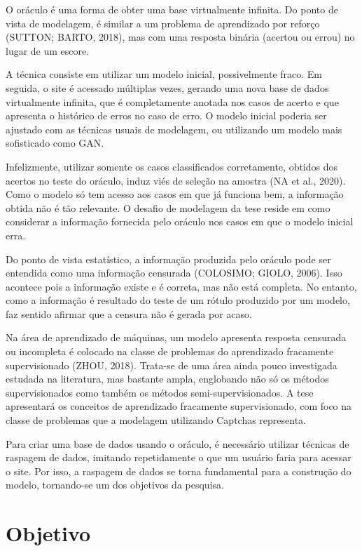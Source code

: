 \documentclass[12pt,twoside,brazilian]{book}
\begin{document}
O oráculo é uma forma de obter uma base virtualmente infinita. Do ponto
de vista de modelagem, é similar a um problema de aprendizado por
reforço (SUTTON; BARTO, 2018), mas com uma resposta binária (acertou ou
errou) no lugar de um escore.

A técnica consiste em utilizar um modelo inicial, possivelmente fraco.
Em seguida, o site é acessado múltiplas vezes, gerando uma nova base de
dados virtualmente infinita, que é completamente anotada nos casos de
acerto e que apresenta o histórico de erros no caso de erro. O modelo
inicial poderia ser ajustado com as técnicas usuais de modelagem, ou
utilizando um modelo mais sofisticado como GAN.

Infelizmente, utilizar somente os casos classificados corretamente,
obtidos dos acertos no teste do oráculo, induz viés de seleção na
amostra (NA et al., 2020). Como o modelo só tem acesso aos casos em que
já funciona bem, a informação obtida não é tão relevante. O desafio de
modelagem da tese reside em como considerar a informação fornecida pelo
oráculo nos casos em que o modelo inicial erra.

Do ponto de vista estatístico, a informação produzida pelo oráculo pode
ser entendida como uma informação censurada (COLOSIMO; GIOLO, 2006).
Isso acontece pois a informação existe e é correta, mas não está
completa. No entanto, como a informação é resultado do teste de um
rótulo produzido por um modelo, faz sentido afirmar que a censura não é
gerada por acaso.

Na área de aprendizado de máquinas, um modelo apresenta resposta
censurada ou incompleta é colocado na classe de problemas do aprendizado
fracamente supervisionado (ZHOU, 2018). Trata-se de uma área ainda pouco
investigada estudada na literatura, mas bastante ampla, englobando não
só os métodos supervisionados como também os métodos
semi-supervisionados. A tese apresentará os conceitos de aprendizado
fracamente supervisionado, com foco na classe de problemas que a
modelagem utilizando Captchas representa.

Para criar uma base de dados usando o oráculo, é necessário utilizar
técnicas de raspagem de dados, imitando repetidamente o que um usuário
faria para acessar o site. Por isso, a raspagem de dados se torna
fundamental para a construção do modelo, tornando-se um dos objetivos da
pesquisa.

\hypertarget{sec-objetivos}{%
\section{Objetivo}\label{sec-objetivos}}
\end{document}
